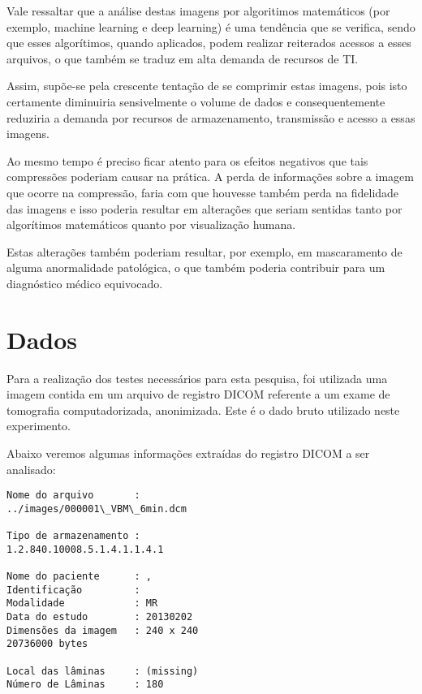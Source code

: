 \documentclass{IEEEtran}
\begin{document}
Vale ressaltar que a análise destas imagens por algoritimos matemáticos
(por exemplo, machine learning e deep learning) é uma tendência que se
verifica, sendo que esses algorítimos, quando aplicados, podem realizar
reiterados acessos a esses arquivos, o que também se traduz em alta
demanda de recursos de TI.

Assim, supõe-se pela crescente tentação de se comprimir estas imagens,
pois isto certamente diminuiria sensivelmente o volume de dados e
consequentemente reduziria a demanda por recursos de armazenamento,
transmissão e acesso a essas imagens.

Ao mesmo tempo é preciso ficar atento para os efeitos negativos que tais
compressões poderiam causar na prática. A perda de informações sobre a
imagem que ocorre na compressão, faria com que houvesse também perda na
fidelidade das imagens e isso poderia resultar em alterações que seriam
sentidas tanto por algorítimos matemáticos quanto por visualização
humana.

Estas alterações também poderiam resultar, por exemplo, em mascaramento
de alguma anormalidade patológica, o que também poderia contribuir para
um diagnóstico médico equivocado.

    \section{Dados}\label{dados}

    Para a realização dos testes necessários para esta pesquisa, foi
utilizada uma imagem contida em um arquivo de registro DICOM referente a
um exame de tomografia computadorizada, anonimizada. Este é o dado bruto
utilizado neste experimento.



    Abaixo veremos algumas informações extraídas do registro DICOM a ser
analisado:


    \begin{Verbatim}[commandchars=\\\{\}]
Nome do arquivo       :
../images/000001\_VBM\_6min.dcm

Tipo de armazenamento :
1.2.840.10008.5.1.4.1.1.4.1

Nome do paciente      : , 
Identificação         : 
Modalidade            : MR
Data do estudo        : 20130202
Dimensões da imagem   : 240 x 240
20736000 bytes

Local das lâminas     : (missing)
Número de Lâminas     : 180

    \end{Verbatim}
\end{document}
